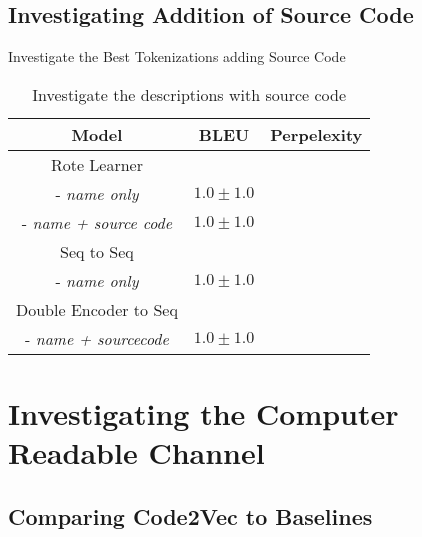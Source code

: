 \subsection{Investigating Addition of Source Code} %
\label{subs:investigating_tokenizations_with_source_code}

Investigate the Best Tokenizations adding Source Code
\begin{table}[h!]
\begin{center}
\begin{tabular}{ c | c | c }
    Model                               & BLEU             & Perpelexity \\
    \hline
    \hline
    Rote Learner                        &                  & \\    
    - \textit{name only}                & $1.0 \pm 1.0 $   & \\
    - \textit{name + source code}       & $1.0 \pm 1.0 $   & \\
    \hline
    \hline
    Seq to Seq                          &                  &  \\
    - \textit{name only}                & $1.0 \pm 1.0 $   & \\
    \hline
    \hline
    Double Encoder to Seq               &                  &  \\
    - \textit{name + sourcecode}        & $1.0 \pm 1.0 $   & \\
    \hline
\end{tabular}
\caption {Investigate the descriptions with source code}
\label{table:human_source_code}
\end{center}
\end{table}





\section{Investigating the Computer Readable Channel} %
\label{sec:investigating_the_computer_channel}

\subsection{Comparing Code2Vec to Baselines} %
\label{sub:comparing_code2vec_to_baselines}

